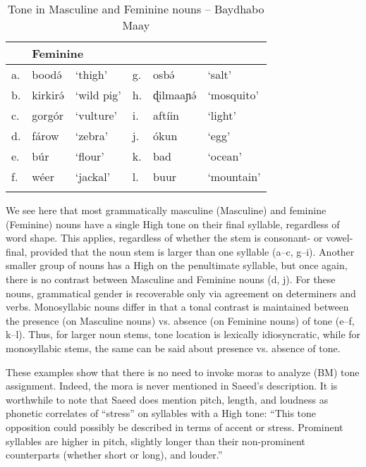 \documentclass[output=paper,colorlinks,citecolor=brown]{langscibook}
\begin{document}
\begin{table}
\caption{Tone in Masculine and Feminine nouns -- Baydhabo Maay}
\label{tab:MFSaeed}
 \begin{tabular}{llllll}
  \lsptoprule
    \multicolumn{3}{l}{Masculine}  &  \multicolumn{3}{l}{Feminine} \\
  \midrule
  a.& boodə́ & `thigh' & g.& osbə́ & `salt' \\
b. & kirkirə́ & `wild pig' & h. & ɖilmaaɲə́ & `mosquito' \\
c. & gorgór & `vulture' & i. &aftíin & `light' \\
d. & fárow & `zebra' & j. &ókun & `egg' \\
e. & búr & `flour' & k. &bad & `ocean' \\
f. & wéer & `jackal' & l. & buur & `mountain' \\
  \lspbottomrule
 \end{tabular}
\end{table}

We see here that most grammatically masculine (Masculine) and feminine (Feminine) nouns have a single High tone on their final syllable, regardless of word shape. This applies, regardless of whether the stem is consonant- or vowel-final, provided that the noun stem is larger than one syllable (a--c, g--i). Another smaller group of nouns has a High on the penultimate syllable, but once again, there is no contrast between Masculine and Feminine nouns (d, j). For these nouns, grammatical gender is recoverable only via agreement on determiners and verbs. Monosyllabic nouns differ in that a tonal contrast is maintained between the presence (on Masculine nouns) vs. absence (on Feminine nouns) of tone (e--f, k--l). Thus, for larger noun stems, tone location is lexically idiosyncratic, while for monosyllabic stems, the same can be said about presence vs. absence of tone. 

These examples show that there is no need to invoke moras to analyze  (BM) tone assignment. Indeed, the mora is never mentioned in Saeed's description. It is worthwhile to note that Saeed \citeyearpar[8]{Saeed1982} does mention pitch, length, and loudness as phonetic correlates of ``stress'' on syllables with a High tone: ``This tone opposition could possibly be described in terms of accent or stress. Prominent  syllables are higher in pitch, slightly longer than their non-prominent counterparts (whether short or long), and louder.''
\end{document}
